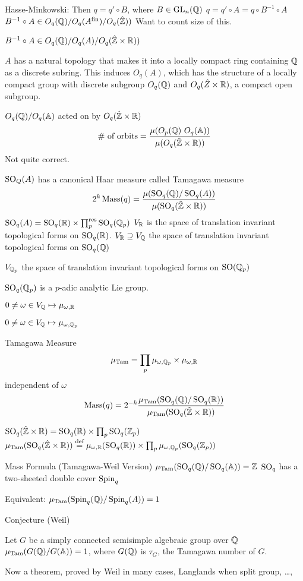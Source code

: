Hasse-Minkowski:
Then $q= q' \circ B$, where $B \in \operatorname{GL}_n(\mathbb{Q})$
$q= q' \circ A= q \circ B^{-1} \circ A$
$B^{-1} \circ A \in O_q(\mathbb{Q})/O_q(A^\text{fin})/O_q(\hat{\mathbb{Z}}))$
Want to count size of this. 

$B^{-1} \circ A \in O_q(\mathbb{Q})/O_q(A)/O_q(\hat{\mathbb{Z}} \times \mathbb{R}))$


$A$ has a natural topology that makes it into a locally compact ring containing $\mathbb{Q}$ as a discrete subring. This induces $O_q(A)$, which has the structure of a locally compact group with discrete subgroup $O_q(\mathbb{Q})$ and $O_q(\hat{Z}\times\mathbb{R})$, a compact open subgroup. 

$O_q(\mathbb{Q}) / O_q(\mathbb{A})$ acted on by $O_q(\hat{\mathbb{Z}}\times\mathbb{R})$
	\[
	\text{\# of orbits}= \dfrac{\mu(O_p(\Q)\ O_q(\A))}{\mu(O_q(\hat{\Z}\times\R))}
	\]
Not quite correct. 

$\operatorname{SO}_Q(A)$ has a canonical Haar measure called Tamagawa measure
	\[
	2^k \operatorname{Mass}(q)= \dfrac{\mu(\operatorname{SO}_q(\mathbb{Q}) / \operatorname{SO}_q(A))}{\mu(\operatorname{SO}_q(\hat{\mathbb{Z}} \times \mathbb{R}))}
	\]
$\operatorname{SO}_q(A)= \operatorname{SO}_q(\mathbb{R}) \times \prod_p^\text{res} \operatorname{SO}_q(\mathbb{Q}_p)$
$V_{\mathbb{R}}$ is the space of translation invariant topological forms on $\operatorname{SO}_q(\mathbb{R})$.
$V_{\mathbb{R}} \supseteq V_{\mathbb{Q}}$ the space of translation invariant topological forms on $\operatorname{SO}_q(\mathbb{Q})$


$V_{\mathbb{Q}_p}$ the space of translation invariant topological forms on $\operatorname{SO}(\mathbb{Q}_p)$

$\operatorname{SO}_q(\mathbb{Q}_p)$ is a $p$-adic analytic Lie group. 

$0 \neq \omega \in V_{\mathbb{Q}} \mapsto \mu_{\omega,\mathbb{R}}$

$0 \neq \omega \in V_{\mathbb{Q}} \mapsto \mu_{\omega,\mathbb{Q}_p}$

Tamagawa Measure
	\[
	\mu_\text{Tam}= \prod_p \mu_{\omega,\mathbb{Q}_p} \times \mu_{\omega,\mathbb{R}}
	\]
independent of $\omega$
	\[
	\operatorname{Mass}(q)= 2^{-k} \dfrac{\mu_\text{Tam}(\operatorname{SO}_q(\mathbb{Q})/\operatorname{SO}_q(\mathbb{R}))}{\mu_\text{Tam}(\operatorname{SO}_q(\hat{\mathbb{Z}}\times\mathbb{R}))}
	\]

$\operatorname{SO}_q(\hat{\mathbb{Z}}\times\mathbb{R})= \operatorname{SO}_q(\mathbb{R}) \times \prod_p \operatorname{SO}_q(\mathbb{Z}_p)$
$\mu_\text{Tam}(\operatorname{SO}_q(\hat{\mathbb{Z}}\times\mathbb{R})) \stackrel{\text{def}}{=} \mu_{\omega,\mathbb{R}}(\operatorname{SO}_q(\mathbb{R})) \times \prod_p \mu_{\omega,\mathbb{Q}_p}(\operatorname{SO}_q(\mathbb{Z}_p))$


Mass Formula (Tamagawa-Weil Version)
$\mu_\text{Tam}(\operatorname{SO}_q(\mathbb{Q}) / \operatorname{SO}_q(\mathbb{A}))= \mathbb{Z}$
$\operatorname{SO}_q$ has a two-sheeted double cover $\operatorname{Spin}_q$

Equivalent:
$\mu_\text{Tam}(\operatorname{Spin}_q(\mathbb{Q}) / \operatorname{Spin}_q(A))=1$

Conjecture (Weil)

Let $G$ be a simply connected semisimple algebraic group over $\mathbb{Q}$
$\mu_\text{Tam}(G(\mathbb{Q})/G(\mathbb{A}))=1$, where $G(\mathbb{Q})$ is $\tau_G$, the Tamagawa number of $G$.

Now a theorem, proved by Weil in many cases, Langlands when split group, \dots, 






















